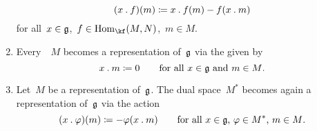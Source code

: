 \begin{proposition}
\begin{enumerate}
      \[
        (x \mathbin{.} f)(m)
        \coloneqq
        x \mathbin{.} f(m) - f(x \mathbin{.} m)
      \]
      for all~$x \in \mathfrak{g}$,~$f \in \Hom_{\kf}(M,N)$,~$m \in M$.
    \item
      Every~{\vectorspace{$\kf$}}~$M$ becomes a representation of~$\mathfrak{g}$ via the  given by
      \[
        x \mathbin{.} m
        \coloneqq
        0
        \qquad
        \text{for all~$x \in \mathfrak{g}$ and~$m \in M$.}
      \]
    \item
      Let~$M$ be a representation of~$\mathfrak{g}$.
      The dual space~$M^*$ becomes again a representation of~$\mathfrak{g}$ via the action
      \[
        (x \mathbin{.} \varphi)(m)
        \coloneqq
        - \varphi(x \mathbin{.} m)
        \qquad
        \text{for all~$x \in \mathfrak{g}$,~$\varphi \in M^*$,~$m \in M$.}
      \]
  \end{enumerate}
\end{proposition}


